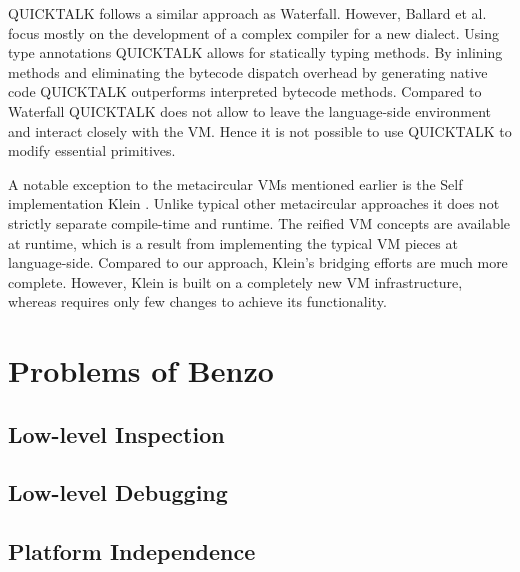 QUICKTALK \cite{Ball86a} follows a similar approach as Waterfall.
However, Ballard et al. focus mostly on the development of a complex compiler for a new \ST dialect.
Using type annotations QUICKTALK allows for statically typing methods.
By inlining methods and eliminating the bytecode dispatch overhead by generating native code QUICKTALK outperforms interpreted bytecode methods.
Compared to Waterfall QUICKTALK does not allow to leave the language-side environment and interact closely with the VM.
Hence it is not possible to use QUICKTALK to modify essential primitives.

A notable exception to the metacircular VMs mentioned earlier is the Self implementation Klein \cite{Unga05a}.
Unlike typical other metacircular approaches it does not strictly separate compile-time and runtime.
The reified VM concepts are available at runtime, which is a result from implementing the typical VM pieces at language-side.
Compared to our approach, Klein's bridging efforts are much more complete.
However, Klein is built on a completely new VM infrastructure, whereas \B requires only few changes to achieve its functionality.


\section{Problems of Benzo}

\subsection{Low-level Inspection}

\subsection{Low-level Debugging}

\subsection{Platform Independence}

